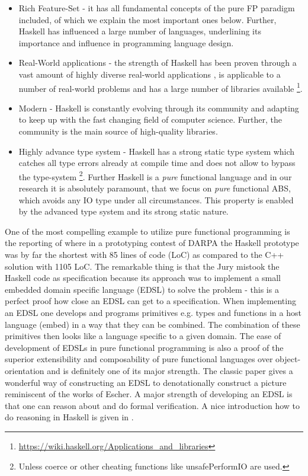 \begin{itemize}
	\item Rich Feature-Set - it has all fundamental concepts of the pure FP paradigm included, of which we explain the most important ones below. Further, Haskell has influenced a large number of languages, underlining its importance and influence in programming language design.
	
	\item Real-World applications - the strength of Haskell has been proven through a vast amount of highly diverse real-world applications \cite{hudak_haskell_1994, hudak_history_2007}, is applicable to a number of real-world problems \cite{osullivan_real_2008} and has a large number of libraries available \footnote{\url{https://wiki.haskell.org/Applications_and_libraries}}.
	
	\item Modern - Haskell is constantly evolving through its community and adapting to keep up with the fast changing field of computer science. Further, the community is the main source of high-quality libraries.
	
	\item Highly advance type system - Haskell has a strong static type system which catches all type errors already at compile time and does not allow to bypass the type-system \footnote{Unless coerce or other cheating functions like unsafePerformIO are used.}. Further Haskell is a \textit{pure} functional language and in our research it is absolutely paramount, that we focus on \textit{pure} functional ABS, which avoids any IO type under all circumstances. This property is enabled by the advanced type system and its strong static nature.
\end{itemize}

One of the most compelling example to utilize pure functional programming is the reporting of \cite{hudak_haskell_1994} where in a prototyping contest of DARPA the Haskell prototype was by far the shortest with 85 lines of code (LoC) as compared to the C++ solution with 1105 LoC. The remarkable thing is that the Jury mistook the Haskell code as specification because its approach was to implement a small embedded domain specific language (EDSL) to solve the problem - this is a perfect proof how close an EDSL can get to a specification. When implementing an EDSL one develops and programs primitives e.g. types and functions in a host language (embed) in a way that they can be combined. The combination of these primitives then looks like a language specific to a given domain. The ease of development of EDSLs in pure functional programming is also a proof of the superior extensibility and composability of pure functional languages over object-orientation and is definitely one of its major strength. The classic paper \cite{henderson_functional_1982} gives a wonderful way of constructing an EDSL to denotationally construct a picture reminiscent of the works of Escher. A major strength of developing an EDSL is that one can reason about and do formal verification. A nice introduction how to do reasoning in Haskell is given in \cite{hutton_tutorial_1999}.

